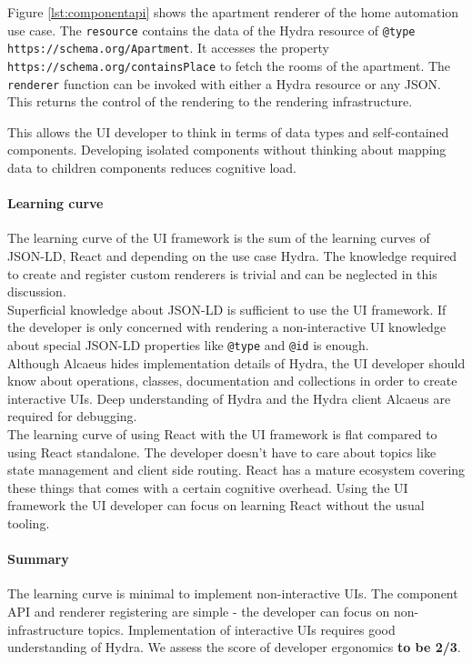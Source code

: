 Figure \ref{lst:componentapi} shows the apartment renderer of the home automation use case. The \lstinline{resource} contains the data of the Hydra resource of \lstinline{@type} \lstinline{https://schema.org/Apartment}. It accesses the property \lstinline{https://schema.org/containsPlace} to fetch the rooms of the apartment. The \lstinline{renderer} function can be invoked with either a Hydra resource or any JSON. This returns the control of the rendering to the rendering infrastructure.

This allows the UI developer to think in terms of data types and self-contained components. Developing isolated components without thinking about mapping data to children components reduces cognitive load.

\paragraph{Learning curve}
The learning curve of the UI framework is the sum of the learning curves of JSON-LD, React and depending on the use case Hydra. The knowledge required to create and register custom renderers is trivial and can be neglected in this discussion. \\
Superficial knowledge about JSON-LD is sufficient to use the UI framework. If the developer is only concerned with rendering a non-interactive UI knowledge about special JSON-LD properties like \lstinline{@type} and \lstinline{@id} is enough. \\
Although Alcaeus hides implementation details of Hydra, the UI developer should know about operations, classes, documentation and collections in order to create interactive UIs. Deep understanding of Hydra and the Hydra client Alcaeus are required for debugging. \\
The learning curve of using React with the UI framework is flat compared to using React standalone. The developer doesn't have to care about topics like state management and client side routing. React has a mature ecosystem covering these things that comes with a certain cognitive overhead. Using the UI framework the UI developer can focus on learning React without the usual tooling.

\paragraph{Summary}
The learning curve is minimal to implement non-interactive UIs. The component API and renderer registering are simple - the developer can focus on non-infrastructure topics. Implementation of interactive UIs requires good understanding of Hydra. We assess the score of developer ergonomics \textbf{to be 2/3}.

